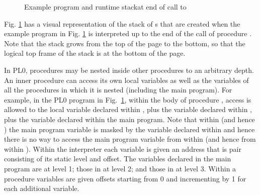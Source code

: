 \documentclass[a4paper,twoside]{article}
\begin{document}
\begin{figure}[ht]
\begin{minipage}{0.5\textwidth}
\end{minipage}
\caption{Example program and runtime stackat end of call to }\label{figure:exampleprog}
\end{figure}
Fig. \ref{figure:exampleprog} has a visual representation of the stack of
s that are created when the example program in Fig.
\ref{figure:exampleprog} is interpreted up to the end of the call of procedure .
Note that the stack grows from the top of the page to the bottom,
so that the logical top frame of the stack is at the bottom of the page.


In PL0, procedures may be nested inside other procedures to an arbitrary depth.
An inner procedure can access its own local variables
as well as the variables of all the procedures in which it is nested 
(including the main program).
For example, in the PL0 program in Fig.~\ref{figure:exampleprog},
within the body of procedure , access is allowed to 
the local variable  declared within ,
plus the variable  declared within ,
plus the variable  declared within the main program.
Note that within  (and hence ) the main program variable 
is masked by the variable  declared within 
and hence there is no way to access the main program variable 
from within  (and hence from within ).
Within the interpreter each variable is given an address
that is pair consisting of its static level and offset.
The variables declared in the main program are at level 1;
those in  at level 2;
and
those in  at level 3.
Within a procedure variables are given offsets starting from 0
and incrementing by 1 for each additional variable.
\end{document}
